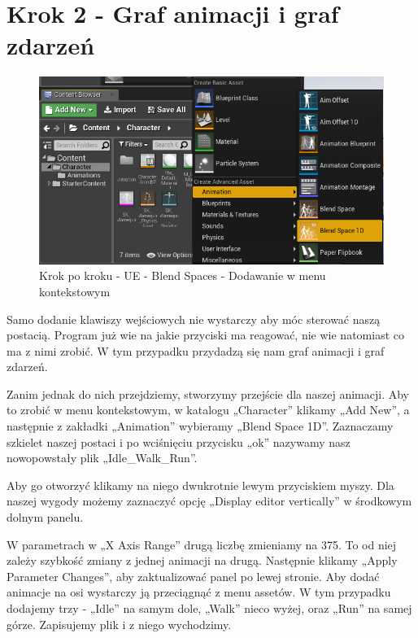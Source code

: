 \documentclass[12pt]{xmgr}
\begin{document}
\newpage
\section{Krok 2 - Graf animacji i graf zdarzeń}

\begin{figure}[!htb]
    \begin{center}
    \includegraphics[scale=0.5]{Screeny/UeKrokPoKroku/UE-BlendSpace-Add.png}
    \end{center}
    \caption{Krok po kroku - UE - Blend Spaces - Dodawanie w menu kontekstowym}
\end{figure}

Samo dodanie klawiszy wejściowych nie wystarczy aby móc sterować naszą postacią. Program już wie na jakie przyciski ma reagować, nie wie natomiast co ma z nimi zrobić. W tym przypadku przydadzą się nam graf animacji i graf zdarzeń.

Zanim jednak do nich przejdziemy, stworzymy przejście dla naszej animacji. Aby to zrobić w menu kontekstowym, w katalogu „Character” klikamy „Add New”, a następnie z zakładki „Animation” wybieramy „Blend Space 1D”. Zaznaczamy szkielet naszej postaci i po wciśnięciu przycisku „ok” nazywamy nasz nowopowstały plik „Idle\_Walk\_Run”.

Aby go otworzyć klikamy na niego dwukrotnie lewym przyciskiem myszy. Dla naszej wygody możemy zaznaczyć opcję „Display editor vertically” w środkowym dolnym panelu.

W parametrach w „X Axis Range” drugą liczbę zmieniamy na 375. To od niej zależy szybkość zmiany z jednej animacji na drugą. Następnie klikamy „Apply Parameter Changes”, aby zaktualizować panel po lewej stronie. Aby dodać animacje na osi wystarczy ją przeciągnąć z menu assetów. W tym przypadku dodajemy trzy - „Idle” na samym dole, „Walk” nieco wyżej, oraz „Run” na samej górze. Zapisujemy plik i z niego wychodzimy.
\end{document}
